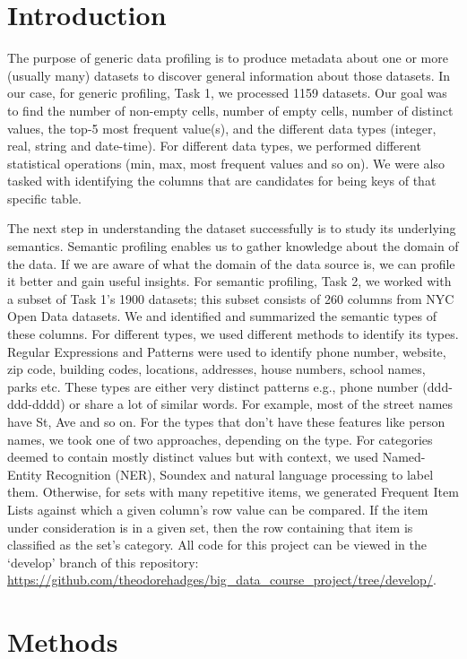 \documentclass[sigconf,authordraft]{acmart}
\begin{document}
\section{Introduction}
The purpose of generic data profiling is to produce metadata about one or more (usually many) datasets to discover general information about those datasets. In our case, for generic profiling, Task 1, we 
processed 1159 datasets. Our goal was to find the number of non-empty 
cells, number of empty cells, number of distinct values, the top-5 most 
frequent value(s), and the different data types
(integer, real, string and date-time). For different data types, we 
performed different statistical operations (min, max, most frequent values and so on). We were also tasked with identifying the
columns that are candidates for being keys of that specific table. 

The next step in understanding the dataset successfully is to study its underlying semantics. Semantic profiling enables us to gather knowledge
about the domain of
the data. If we are aware of what the domain of the data source is, we can 
profile it better and gain useful insights. For semantic profiling, Task 2,
we worked with a subset of Task 1's 1900 datasets; this subset consists of 260 columns from NYC Open Data datasets. We and identified and summarized the semantic types of these columns. For
different types, we used different methods to identify its types.
Regular Expressions and Patterns were used to identify phone number, website,
zip code, building
codes, locations, addresses, house numbers, school names, parks etc. These 
types are either very
distinct patterns e.g., phone number (ddd-ddd-dddd) or share a lot of similar
words. For example, most of the
street names have St, Ave and so on. For the types that don’t have these 
features like person names,
we took one of two approaches, depending on the type. For categories deemed
to contain mostly
distinct values but with context, we used Named-Entity Recognition (NER), 
Soundex and
natural language processing to label them. Otherwise, for sets with many 
repetitive items, we
generated Frequent Item Lists against which a given column’s row value can 
be compared. If the
item under consideration is in a given set, then the row containing that 
item is classified as the
set’s category. All code for this project can be viewed in the `develop' 
branch of this repository:
\url{https://github.com/theodorehadges/big_data_course_project/tree/develop/}.


\section{Methods}
\end{document}
